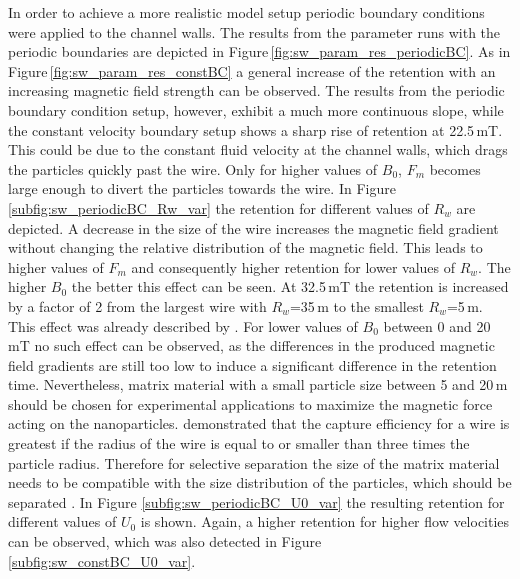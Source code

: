 \FloatBarrier
In order to achieve a more realistic model setup periodic boundary conditions were applied to the channel walls. The results from the parameter runs with the periodic boundaries are depicted in Figure\,\ref{fig:sw_param_res_periodicBC}. As in Figure\,\ref{fig:sw_param_res_constBC} a general increase of the retention with an increasing magnetic field strength can be observed. The results from the periodic boundary condition setup, however, exhibit a much more continuous slope, while the constant velocity boundary setup shows a sharp rise of retention at 22.5\,mT. This could be due to the constant fluid velocity at the channel walls, which drags the particles quickly past the wire. Only for higher values of $B_{0}$, $F_{m}$ becomes large enough to divert the particles towards the wire. In Figure \ref{subfig:sw_periodicBC_Rw_var} the retention for different values of $R_{w}$ are depicted. A decrease in the size of the wire increases the magnetic field gradient without changing the relative distribution of the magnetic field. This leads to higher values of $F_{m}$ and consequently higher retention for lower values of $R_{w}$. The higher $B_{0}$ the better this effect can be seen. At 32.5\,mT the retention is increased by a factor of 2 from the largest wire with $R_{w}$=35\,\textmu m to the smallest $R_{w}$=5\,\textmu m. This effect was already described by \cite{aharoni1976traction}. For lower values of $B_{0}$ between 0 and 20\,mT no such effect can be observed, as the differences in the produced magnetic field gradients are still too low to induce a significant difference in the retention time. Nevertheless, matrix material with a small particle size between 5 and 20\,\textmu m should be chosen for experimental applications to maximize the magnetic force acting on the nanoparticles. \cite{oberteuffer1974magnetic} demonstrated that the capture efficiency for a wire is greatest if the radius of the wire is equal to or smaller than three times the particle radius. Therefore for selective separation the size of the matrix material needs to be compatible with the size distribution of the particles, which should be separated \cite{ge2017magnetic}. In Figure \ref{subfig:sw_periodicBC_U0_var} the resulting retention for different values of  $U_{0}$ is shown. Again, a higher retention for higher flow velocities can be observed, which was also detected in Figure \,\ref{subfig:sw_constBC_U0_var}. 

